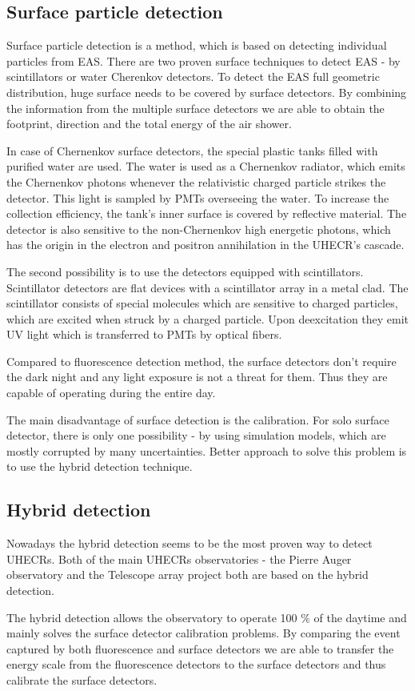 \subsection{Surface particle detection}
Surface particle detection is a method, which is based on detecting individual particles from EAS. There are two proven surface techniques to detect EAS - by scintillators or water Cherenkov detectors. To detect the EAS full geometric distribution, huge surface needs to be covered by surface detectors. By combining the information from the multiple surface detectors we are able to obtain the footprint, direction and the total energy of the air shower.
\par
In case of Chernenkov surface detectors, the special plastic tanks filled with purified water are used. The water is used as a Chernenkov radiator, which emits the Chernenkov photons whenever the relativistic charged particle strikes the detector. This light is sampled by PMTs overseeing the water.
To increase the collection efficiency, the tank's inner surface is covered by reflective material. The detector is also sensitive to the non-Chernenkov high energetic photons, which has the origin in the electron and positron annihilation in the UHECR's cascade.
\par
The second possibility is to use the detectors equipped with scintillators. Scintillator detectors are flat devices with a scintillator array in a metal clad. The scintillator consists of special molecules which are sensitive to charged particles, which are excited when struck by a charged particle. Upon deexcitation they emit UV light which is transferred to PMTs by optical fibers.
\par
Compared to fluorescence detection method, the surface detectors don't require the dark night and any light exposure is not a threat for them. Thus they are capable of operating during the entire day. 

\par
The main disadvantage of surface detection is the calibration. For solo surface detector, there is only one possibility - by using simulation models, which are mostly corrupted by many uncertainties. Better approach to solve this problem is to use the hybrid detection technique.

\subsection{Hybrid detection}
Nowadays the hybrid detection seems to be the most proven way to detect UHECRs. Both of the main UHECRs observatories - the Pierre Auger observatory and the Telescope array project both are based on the hybrid detection. 
\par
The hybrid detection allows the observatory to operate 100 $\%$ of the daytime and mainly solves the surface detector calibration problems. By comparing the event captured by both fluorescence and surface detectors we are able to transfer the energy scale from the fluorescence detectors to the surface detectors and thus calibrate the surface detectors.



